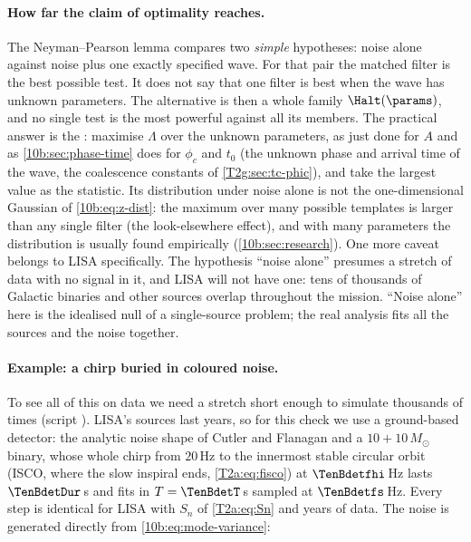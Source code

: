 \paragraph{How far the claim of optimality reaches.} The Neyman--Pearson lemma compares two \emph{simple}
hypotheses: noise alone against noise plus one exactly specified wave. For that pair the matched filter is the best
possible test. It does not say that one filter is best when the wave has unknown parameters. The alternative is then a
whole family $\Halt(\params)$, and no single test is the most powerful against all its members. The practical
answer is the : maximise $\Lambda$ over the unknown parameters, as just done for
$A$ and as \cref{10b:sec:phase-time} does for $\phi_c$ and $t_0$ (the unknown phase and arrival time of the wave, the
coalescence constants of \cref{T2g:sec:tc-phic}), and take the largest value as the statistic. Its
distribution under noise alone is not the one-dimensional Gaussian of \eqref{10b:eq:z-dist}: the maximum over many
possible templates is larger than any single filter (the look-elsewhere effect), and with many parameters the
distribution is usually found empirically (\cref{10b:sec:research}). One more caveat belongs to LISA specifically. The
hypothesis ``noise alone'' presumes a stretch of data with no signal in it, and LISA will not have one: tens of
thousands of Galactic binaries and other sources overlap throughout the mission. ``Noise alone'' here is the
idealised null of a single-source problem; the real analysis fits all the sources and the noise together.

\paragraph{Example: a chirp buried in coloured noise.}
To see all of this on data we need a stretch short enough to simulate thousands of times
(script ). LISA's sources last years, so for this check we use a ground-based detector: the analytic noise shape of
Cutler and Flanagan \cite[eq.~(4)]{CutlerFlanagan1994} and a $10+10\,M_\odot$ binary, whose whole chirp from
$20$\,Hz to the innermost stable circular orbit (ISCO, where the slow inspiral ends, \cref{T2a:eq:fisco}) at $\TenBdetfhi$\,Hz lasts $\TenBdetDur$\,s and fits in $T=\TenBdetT$\,s sampled at
$\TenBdetfs$\,Hz. Every step is identical for LISA with $S_n$ of \cref{T2a:eq:Sn} and years of data. The noise is
generated directly from \eqref{10b:eq:mode-variance}:

